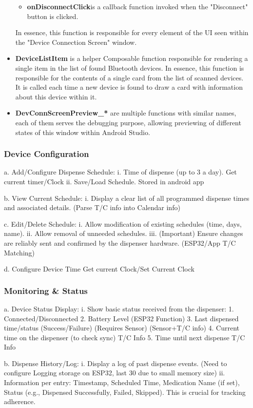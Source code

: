 \begin{itemize}
\begin{itemize}
		\item \textbf{onDisconnectClick}is a callback function invoked when the "Disconnect" button is clicked.
	\end{itemize}
	In essence, this function is responsible for every element of the \ac{UI} seen within the "Device Connection Screen" window.
	\item \textbf{DeviceListItem} is a helper Composable function responsible for rendering a single item in the list of found Bluetooth devices. In essence, this function is responsible for the contents of a single card from the list of scanned devices. It is called each time a new device is found to draw a card with information about this device within it.
	\item \textbf{DevConnScreenPreview\_*} are multiple functions with similar names, each of them serves the debugging purpose, allowing previewing of different states of this window within Android Studio.
\end{itemize}

\subsubsection{Device Configuration}
  a. Add/Configure Dispense Schedule:
  i. Time of dispense (up to 3 a day). Get current timer/Clock
  ii. Save/Load Schedule. Stored in android app
  
  b. View Current Schedule:
  i. Display a clear list of all programmed dispense times and associated details. (Parse T/C info into Calendar info)
  
  c. Edit/Delete Schedule:
  i. Allow modification of existing schedules (time, days, name).
  ii. Allow removal of unneeded schedules.
  iii. (Important) Ensure changes are reliably sent and confirmed by the dispenser hardware. (ESP32/App T/C Matching)
  
  d. Configure Device Time Get current Clock/Set Current Clock
  
\subsubsection{Monitoring \&  Status}

a. Device Status Display:
i. Show basic status received from the dispenser:
1. Connected/Disconnected
2. Battery Level (ESP32 Function)
3. Last dispensed time/status (Success/Failure) (Requires Sensor) (Sensor+T/C info)
4. Current time on the dispenser (to check sync) T/C Info
5. Time until next dispense T/C Info

b. Dispense History/Log:
i. Display a log of past dispense events. (Need to configure Logging storage on ESP32, last 30 due to small memory size)
ii. Information per entry: Timestamp, Scheduled Time, Medication Name (if set), Status (e.g., Dispensed Successfully, Failed, Skipped). This is crucial for tracking adherence.
